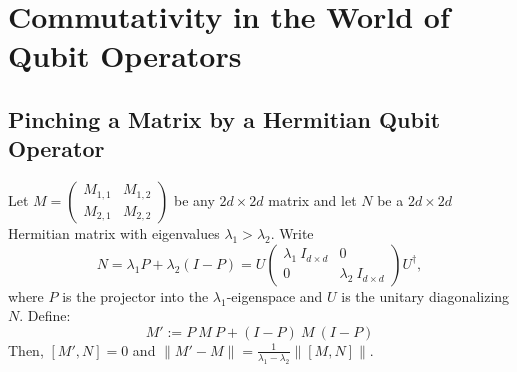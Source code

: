 \section{Commutativity in the World of Qubit Operators}

\subsection{Pinching a Matrix by a Hermitian Qubit Operator}

\begin{theorem}\label{thm:pinch}
    Let $M = \begin{pmatrix}
        M_{1,1} & M_{1,2}\\
        M_{2,1} & M_{2,2}
    \end{pmatrix}$ be any $2d \times 2d$ matrix and let $N$ be a $2d \times 2d$ Hermitian matrix with eigenvalues $\lambda_1 > \lambda_2$. Write
    \[ N= \lambda_1 P + \lambda_2 (I - P) = U \begin{pmatrix}
        \lambda_1\: I_{d \times d} & 0\\ 0 & \lambda_2\: I_{d \times d}
    \end{pmatrix} U^\dagger , \] where $P$ is the projector into the $\lambda_1$-eigenspace and $U$ is the unitary diagonalizing $N$. Define:
    \begin{equation}
        M' := P\ M\ P + (I - P)\ M\ (I - P)
    \end{equation}
    Then, $[M', N] = 0$ and $\|M' - M \| = \frac{1}{\lambda_1 - \lambda_2} \|[M, N]\|$.
\end{theorem}

